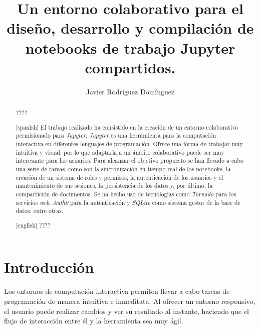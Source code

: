 \documentclass[11pt,spanish,listoffigures]{tfgetsinf}
\title{Un entorno colaborativo para el diseño, desarrollo y compilación de notebooks de trabajo Jupyter compartidos. }
\author{Javier Rodríguez Domínguez}
\begin{document}

\begin{abstract}
????
\end{abstract}
\begin{abstract}[spanish]
El trabajo realizado ha consistido en la creación de un entorno colaborativo permisionado para \textit{Jupyter}. \textit{Jupyter} es una herramienta para la computación interactiva en diferentes lenguajes de programación. Ofrece una forma de trabajar muy intuitiva y visual, por lo que adaptarla a un ámbito colaborativo puede ser muy interesante para los usuarios. Para alcanzar el objetivo propuesto se han llevado a cabo una serie de tareas, como son la sincronización en tiempo real de los notebooks, la creación de un sistema de roles y permisos, la autenticación de los usuarios y el mantenimiento de sus sesiones, la persistencia de los datos y, por último, la compartición de documentos. Se ha hecho uso de tecnologías como \textit{Tornado} para los servicios \textit{web}, \textit{Auth0} para la autenticación y \textit{SQLite} como sistema gestor de la base de datos, entre otras. 
\end{abstract}
\begin{abstract}[english]
????
\end{abstract}


\mainmatter





\chapter{Introducci\'on}
\label{ch:intro}

Los entornos de computación interactiva permiten llevar a cabo tareas de programación de manera intuitiva e inmeditata. Al ofrecer un entorno responsivo, el usuario puede realizar cambios y ver su resultado al instante, haciendo que el flujo de interacción entre él y la herramienta sea muy ágil.
\end{document}

